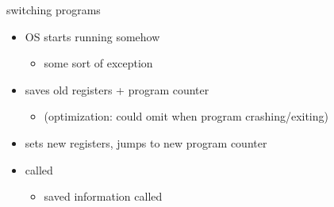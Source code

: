 \usetikzlibrary{arrows.meta,calc,positioning,matrix,patterns}

\begin{frame}{switching programs}
\begin{itemize}
\item OS starts running somehow
    \begin{itemize}
    \item some sort of exception
    \end{itemize}
\item saves old registers + program counter
    \begin{itemize}
    \item (optimization: could omit when program crashing/exiting)
    \end{itemize}
\item sets new registers, jumps to new program counter
\item called 
    \begin{itemize}
    \item saved information called 
    \end{itemize}
\end{itemize}
\end{frame}

\newsavebox{\aContext}
\newsavebox{\bContext}


